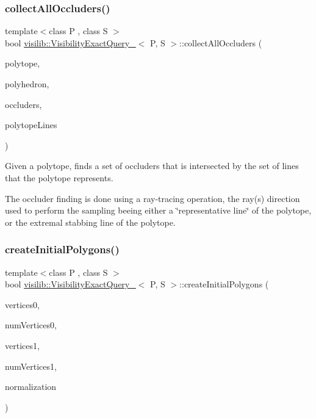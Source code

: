 \subsubsection{\texorpdfstring{collectAllOccluders()}{collectAllOccluders()}}
{\footnotesize\ttfamily template$<$class P , class S $>$ \\
bool \mbox{\hyperlink{classvisilib_1_1_visibility_exact_query__}{visilib\+::\+Visibility\+Exact\+Query\+\_\+}}$<$ P, S $>$\+::collect\+All\+Occluders (\begin{DoxyParamCaption}\item[{\mbox{\hyperlink{classvisilib_1_1_plucker_polytope}{Plucker\+Polytope}}$<$ P $>$ $\ast$}]{polytope,  }\item[{\mbox{\hyperlink{classvisilib_1_1_plucker_polyhedron}{Plucker\+Polyhedron}}$<$ P $>$ $\ast$}]{polyhedron,  }\item[{std\+::vector$<$ \mbox{\hyperlink{classvisilib_1_1_silhouette}{Silhouette}} $\ast$ $>$ \&}]{occluders,  }\item[{std\+::vector$<$ P $>$ \&}]{polytope\+Lines }\end{DoxyParamCaption})}



Given a polytope, finds a set of occluders that is intersected by the set of lines that the polytope represents. 

The occluder finding is done using a ray-\/tracing operation, the ray(s) direction used to perform the sampling beeing either a \char`\"{}representative line\char`\"{} of the polytope, or the extremal stabbing line of the polytope. \mbox{\label{classvisilib_1_1_visibility_exact_query___a8f1759e155f8d6e1880d725ecc74bde3}} 
\subsubsection{\texorpdfstring{createInitialPolygons()}{createInitialPolygons()}}
{\footnotesize\ttfamily template$<$class P , class S $>$ \\
bool \mbox{\hyperlink{classvisilib_1_1_visibility_exact_query__}{visilib\+::\+Visibility\+Exact\+Query\+\_\+}}$<$ P, S $>$\+::create\+Initial\+Polygons (\begin{DoxyParamCaption}\item[{const float $\ast$}]{vertices0,  }\item[{size\+\_\+t}]{num\+Vertices0,  }\item[{const float $\ast$}]{vertices1,  }\item[{size\+\_\+t}]{num\+Vertices1,  }\item[{bool}]{normalization }\end{DoxyParamCaption})\hspace{0.3cm}{\ttfamily [private]}}



